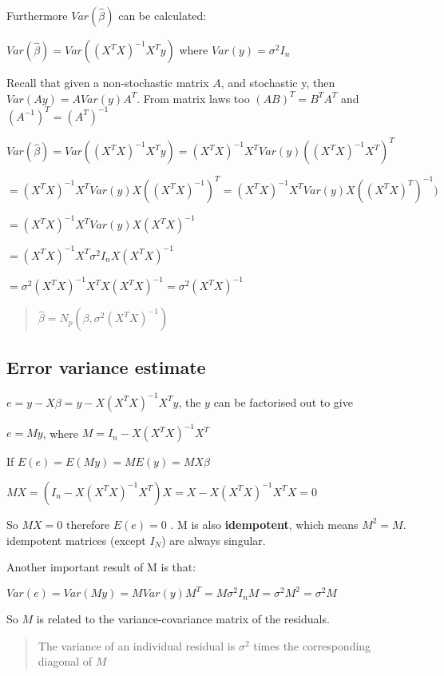 \documentclass[
  letterpaper,
  DIV=11,
  numbers=noendperiod]{scrreprt}
\begin{document}
Furthermore \(Var(\hat{\beta})\) can be calculated:

\(Var(\hat{\beta}) = Var((X^TX)^{-1}X^Ty)\) where
\(Var(y) = \sigma^2I_n\)

Recall that given a non-stochastic matrix \(A\), and stochastic y, then
\(Var(Ay) = A Var(y) A^T\). From matrix laws too \((AB)^T = B^TA^T\) and
\((A^{-1})^T = (A^T)^{-1}\)

\(Var(\hat{\beta}) = Var((X^TX)^{-1}X^Ty) = (X^TX)^{-1}X^T Var(y)((X^TX)^{-1}X^T)^T\)

\(= (X^TX)^{-1}X^T Var(y) X((X^TX)^{-1})^T = (X^TX)^{-1}X^T Var(y) X((X^TX)^T)^{-1})\)

\(= (X^TX)^{-1}X^T Var(y) X(X^TX)^{-1}\)

\(= (X^TX)^{-1}X^T \sigma^2 I_n X(X^TX)^{-1}\)

\(= \sigma^2 (X^TX)^{-1}X^TX(X^TX)^{-1} = \sigma^2 (X^TX)^{-1}\)

\begin{quote}
\(\hat{\beta} = N_p(\beta, \sigma^2 (X^TX)^{-1})\)
\end{quote}

\hypertarget{error-variance-estimate}{%
\subsection{Error variance estimate}\label{error-variance-estimate}}

\(e = y-X\beta = y - X(X^TX)^{-1}X^Ty\), the \(y\) can be factorised out
to give

\(e = My\), where \(M = I_n - X(X^TX)^{-1}X^T\)

If \(E(e) = E(My) = ME(y) = MX\beta\)

\(MX = (I_n - X(X^TX)^{-1}X^T)X = X - X(X^TX)^{-1}X^TX = 0\)

So \(MX = 0\) therefore \(E(e) = 0\) . M is also \textbf{idempotent},
which means \(M^2 = M\). idempotent matrices (except \(I_N\)) are always
singular.

Another important result of M is that:

\(Var(e) = Var(My) = MVar(y)M^T = M\sigma^2I_nM =\sigma^2M^2 = \sigma^2M\)

So \(M\) is related to the variance-covariance matrix of the residuals.

\begin{quote}
The variance of an individual residual is \(\sigma^2\) times the
corresponding diagonal of \(M\)
\end{quote}
\end{document}
